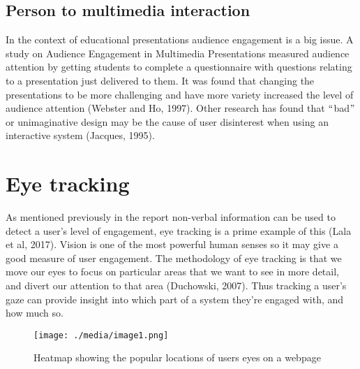 \documentclass[12pt]{article}
\renewcommand{\_}{\kern-1.5pt\textunderscore\kern-1.5pt}
\begin{document}
\subsection*{Person to multimedia interaction}
In the context of educational presentations audience engagement is a big issue. A study on Audience Engagement in Multimedia Presentations measured audience attention by getting students to complete a questionnaire with questions relating to a presentation just delivered to them. It was found that changing the presentations to be more challenging and have more variety increased the level of audience attention (Webster and Ho, 1997). Other research has found that $``$bad$"$  or unimaginative design may be the cause of user disinterest when using an interactive system (Jacques, 1995).\par

\section*{Eye tracking}
As mentioned previously in the report non-verbal information can be used to detect a user's level of engagement, eye tracking is a prime example of this (Lala et al, 2017). Vision is one of the most powerful human senses so it may give a good measure of user engagement. The methodology of eye tracking is that we move our eyes to focus on particular areas that we want to see in more detail, and divert our attention to that area (Duchowski, 2007). Thus tracking a user's gaze can provide insight into which part of a system they’re engaged with, and how much so.\par




\begin{figure}[H]
	\begin{FlushLeft}		\texttt{[image: ./media/image1.png]}
		\caption{Heatmap showing the popular locations of users eyes on a webpage}
		\label{fig:Heatmap_showing_the_popular_locations_of_users_eyes_on_a_webpage}
	\end{FlushLeft}\end{figure}



\par
\end{document}
